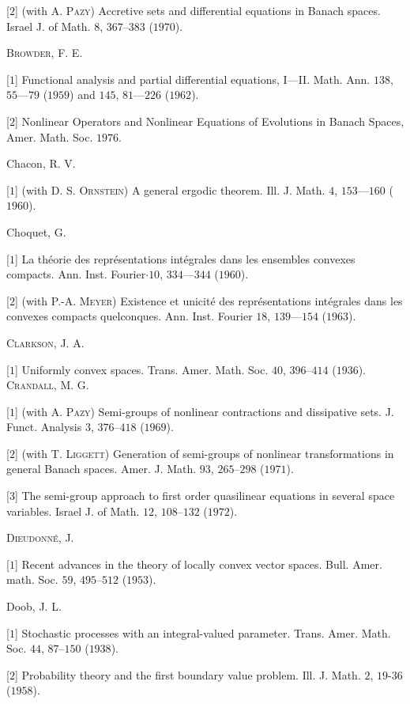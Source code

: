 [$2$] (with A. \textsc{Pazy}) Accretive sets and differential equations in Banach spaces. Israel J. of Math. $8$, $367$--$383$ ($1970$). 

\textsc{Browder}, F. E. 

[$1$] Functional analysis and partial differential equations, I---II. Math. Ann. $138$, $55$---$79$ ($1959$) and $145$, $81$---$226$ ($1962$). 

[$2$] Nonlinear Operators and Nonlinear Equations of Evolutions in Banach Spaces, Amer. Math. Soc. $1976$. 

Chacon, R. V. 

[$1$] (with D. S. \textsc{Ornstein}) A general ergodic theorem. Ill. J. Math. $4$, $153$---$160$ ($1960$). 

Choquet, G. 

[$1$] La théorie des représentations intégrales dans les ensembles convexes compacts. Ann. Inst. Fourier$\cdot$$10$, $334$---$344$ ($1960$). 

[$2$] (with P.-A. \textsc{Meyer}) Existence et unicité des représentations intégrales dans les convexes compacts quelconques. Ann. Inst. Fourier $18$, $139$---$154$ ($1963$). 

\textsc{Clarkson}, J. A. 

[$1$] Uniformly convex spaces. Trans. Amer. Math. Soc. $40$, $396$--$414$ ($1936$). \textsc{Crandall}, M. G. 

[$1$] (with A. \textsc{Pazy}) Semi-groups of nonlinear contractions and dissipative sets. J. Funct. Analysis $3$, $376$--$418$ ($1969$). 

[$2$] (with T. \textsc{Liggett}) Generation of semi-groups of nonlinear transformations in general Banach spaces. Amer. J. Math. $93$, $265$--$298$ ($1971$). 

[$3$] The semi-group approach to first order quasilinear equations in several space variables. Israel J. of Math. $12$, $108$--$132$ ($1972$). 

\textsc{Dieudonné}, J. 

[$1$] Recent advances in the theory of locally convex vector spaces. Bull. Amer. math. Soc. $59$, $495$--$512$ ($1953$). 

Doob, J. L. 

[$1$] Stochastic processes with an integral-valued parameter. Trans. Amer. Math. Soc. $44$, $87$--$150$ ($1938$). 

[$2$] Probability theory and the first boundary value problem. Ill. J. Math. $2$, $19$-$36$ ($1958$). 

